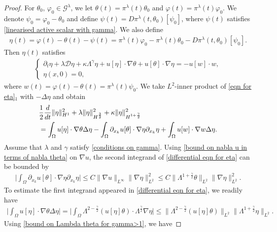 \documentclass[10pt,a4paper]{amsart}
\newcommand{\Gg}{\mathcal{G}^{\lambda}}
\newcommand{\dt}{\partial_t}
\newcommand{\intox}{\int_{\Omega}}
\newcommand{\pin}{\pi^{\lambda}}
\begin{document}
\begin{proof}
For $\theta_0$, $\varphi_0\in\Gg$, we let $\theta(t)=\pin(t)\theta_0$ and $\varphi(t)=\pin(t)\varphi_0$. We denote $\psi_0=\varphi_0-\theta_0$ and define $\psi(t)=D\pin(t, \theta_0)[\psi_0]$, where $\psi(t)$ satisfies \eqref{linearised active scalar with gamma}. We also define 
\begin{align*}
\eta(t)=\varphi(t)-\theta(t)-\psi(t)=\pin(t)\varphi_0-\pin(t)\theta_0-D\pin(t, \theta_0)[\psi_0].
\end{align*}
Then $\eta(t)$ satisfies
\begin{align}\label{eqn for eta}
\left\{ \begin{array}{l}
\dt\eta+\lambda\mathcal{D}\eta+\kappa\Lambda^\gamma\eta+u[\eta]\cdot\nabla\theta+u[\theta]\cdot\nabla\eta=-u[w]\cdot w, \\
\eta(x,0)=0,
\end{array}\right.
\end{align}
where $w(t)=\varphi(t)-\theta(t)=\pin(t)\psi_0$. We take $L^2$-inner product of \eqref{eqn for eta}$_1$ with $-\Delta\eta$ and obtain
\begin{align}\label{differential eqn for eta}
&\frac{1}{2}\frac{d}{dt}\|\eta\|^2_{H^1}+\lambda\|\eta\|^2_{H^{\frac{3}{2}}}+\kappa\|\eta\|^2_{H^{1+\frac{\gamma}{2}}}\notag\\
&=\intox u[\eta]\cdot\nabla\theta\Delta\eta-\intox\partial_{x_k}u[\theta]\cdot\nabla\eta\partial_{x_k}\eta+\intox u[w]\cdot\nabla w\Delta\eta.
\end{align}
Assume that $\lambda$ and $\gamma$ satisfy \eqref{conditions on gamma}. Using \eqref{bound on nabla u in terms of nabla theta} on $\nabla u$, the second integrand of \eqref{differential eqn for eta} can be bounded by 
\begin{align*}
\Big|\intox\partial_{x_k}u[\theta]\cdot\nabla\eta\partial_{x_k}\eta\Big|\le C\|\nabla u\|_{L^\infty}\|\nabla\eta\|^2_{L^2}\le C\|\Lambda^{1+\frac{\gamma}{2}}\theta\|_{L^2}\|\nabla\eta\|^2_{L^2}.
\end{align*}
To estimate the first integrand appeared in \eqref{differential eqn for eta}, we readily have
\begin{align*}
\Big|\intox u[\eta]\cdot\nabla\theta\Delta\eta\Big|=\Big|\intox\Lambda^{2-\frac{\gamma}{2}}(u[\eta]\theta)\cdot\Lambda^\frac{\gamma}{2}\nabla\eta\Big|\le \|\Lambda^{2-\frac{\gamma}{2}}(u[\eta]\theta)\|_{L^2}\|\Lambda^{1+\frac{\gamma}{2}}\eta\|_{L^2}.
\end{align*} 
Using \eqref{bound on Lambda theta for gamma>1}, we have

\end{proof}
\end{document}
